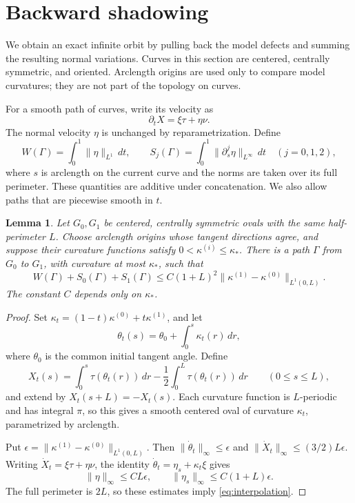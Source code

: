 \documentclass[11pt]{article}
\numberwithin{equation}{section}
\newtheorem{lemma}[theorem]{Lemma}
\newcommand{\norm}[1]{\lVert #1\rVert}
\begin{document}
\section{Backward shadowing}\label{sec:shadow}

We obtain an exact infinite orbit by pulling back the model defects and
summing the resulting normal variations. Curves in this section are centered,
centrally
symmetric, and oriented. Arclength origins are used only to compare model
curvatures; they are not part of the topology on curves.

For a smooth path of curves, write its velocity as
\[
  \partial_tX=\xi\tau+\eta\nu.
\]
The normal velocity \(\eta\) is unchanged by reparametrization. Define
\[
  W(\Gamma)=\int_0^1\norm{\eta}_{L^1}\,dt,\qquad
  S_j(\Gamma)=\int_0^1\norm{\partial_s^j\eta}_{L^\infty}\,dt
  \quad(j=0,1,2),
\]
where \(s\) is arclength on the current curve and the norms are taken over
its full perimeter. These quantities are additive under concatenation. We
also allow paths that are piecewise smooth in \(t\).

\begin{lemma}\label{lem:interpolation}
Let \(G_0,G_1\) be centered, centrally symmetric ovals with the same
half-perimeter \(L\). Choose arclength origins whose tangent directions agree,
and suppose their curvature functions satisfy \(0<\kappa^{(i)}\leq\kappa_*\).
There is a path \(\Gamma\) from \(G_0\) to \(G_1\), with curvature at most
\(\kappa_*\), such that
\begin{equation}\label{eq:interpolation}
  W(\Gamma)+S_0(\Gamma)+S_1(\Gamma)
  \leq C(1+L)^2\norm{\kappa^{(1)}-\kappa^{(0)}}_{L^1(0,L)}.
\end{equation}
The constant \(C\) depends only on \(\kappa_*\).
\end{lemma}

\begin{proof}
Set \(\kappa_t=(1-t)\kappa^{(0)}+t\kappa^{(1)}\), and let
\[
  \theta_t(s)=\theta_0+\int_0^s\kappa_t(r)\,dr,
\]
where \(\theta_0\) is the common initial tangent angle. Define
\begin{equation}\label{eq:interpolated-curve}
  X_t(s)=\int_0^s\tau(\theta_t(r))\,dr
      -\frac12\int_0^L\tau(\theta_t(r))\,dr
  \qquad(0\leq s\leq L),
\end{equation}
and extend by \(X_t(s+L)=-X_t(s)\). Each curvature function is
\(L\)-periodic and has integral \(\pi\), so this gives a smooth centered
oval of curvature \(\kappa_t\), parametrized by arclength.

Put \(\epsilon=\norm{\kappa^{(1)}-\kappa^{(0)}}_{L^1(0,L)}\). Then
\(\norm{\dot\theta_t}_\infty\leq\epsilon\) and
\(\norm{\dot X_t}_\infty\leq(3/2)L\epsilon\). Writing
\(\dot X_t=\xi\tau+\eta\nu\), the identity
\(\dot\theta_t=\eta_s+\kappa_t\xi\) gives
\[
  \norm{\eta}_\infty\leq CL\epsilon,\qquad
  \norm{\eta_s}_\infty\leq C(1+L)\epsilon.
\]
The full perimeter is \(2L\), so these estimates imply
\eqref{eq:interpolation}.
\end{proof}
\end{document}
